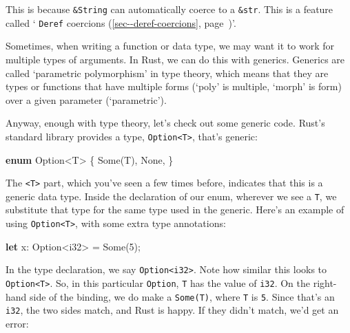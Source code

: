 \documentclass[a4paper,]{book}
\renewcommand*{\hyperref}[2][\ar]{%
  \def\ar{#2}%
  #2 (\autoref{#1}, page~\pageref{#1})}
\newenvironment{Shaded}{\begin{snugshade}}{\end{snugshade}}
\newcommand{\KeywordTok}[1]{\textcolor[rgb]{0.13,0.29,0.53}{\textbf{{#1}}}}
\newcommand{\DataTypeTok}[1]{\textcolor[rgb]{0.13,0.29,0.53}{{#1}}}
\newcommand{\DecValTok}[1]{\textcolor[rgb]{0.00,0.00,0.81}{{#1}}}
\newcommand{\ConstantTok}[1]{\textcolor[rgb]{0.00,0.00,0.00}{{#1}}}
\newcommand{\NormalTok}[1]{{#1}}
\begin{document}
This is because \texttt{\&String} can automatically coerce to a
\texttt{\&str}. This is a feature called
`\hyperref[sec--deref-coercions]{\texttt{Deref} coercions}'.


Sometimes, when writing a function or data type, we may want it to work
for multiple types of arguments. In Rust, we can do this with generics.
Generics are called `parametric polymorphism' in type theory, which
means that they are types or functions that have multiple forms (`poly'
is multiple, `morph' is form) over a given parameter (`parametric').

Anyway, enough with type theory, let's check out some generic code.
Rust's standard library provides a type,
\texttt{Option\textless{}T\textgreater{}}, that's generic:

\begin{Shaded}
\begin{Highlighting}[]
\KeywordTok{enum} \DataTypeTok{Option}\NormalTok{<T> \{}
    \ConstantTok{Some}\NormalTok{(T),}
    \ConstantTok{None}\NormalTok{,}
\NormalTok{\}}
\end{Highlighting}
\end{Shaded}

The \texttt{\textless{}T\textgreater{}} part, which you've seen a few
times before, indicates that this is a generic data type. Inside the
declaration of our enum, wherever we see a \texttt{T}, we substitute
that type for the same type used in the generic. Here's an example of
using \texttt{Option\textless{}T\textgreater{}}, with some extra type
annotations:

\begin{Shaded}
\begin{Highlighting}[]
\KeywordTok{let} \NormalTok{x: }\DataTypeTok{Option}\NormalTok{<}\DataTypeTok{i32}\NormalTok{> = }\ConstantTok{Some}\NormalTok{(}\DecValTok{5}\NormalTok{);}
\end{Highlighting}
\end{Shaded}

In the type declaration, we say
\texttt{Option\textless{}i32\textgreater{}}. Note how similar this looks
to \texttt{Option\textless{}T\textgreater{}}. So, in this particular
\texttt{Option}, \texttt{T} has the value of \texttt{i32}. On the
right-hand side of the binding, we do make a \texttt{Some(T)}, where
\texttt{T} is \texttt{5}. Since that's an \texttt{i32}, the two sides
match, and Rust is happy. If they didn't match, we'd get an error:
\end{document}
